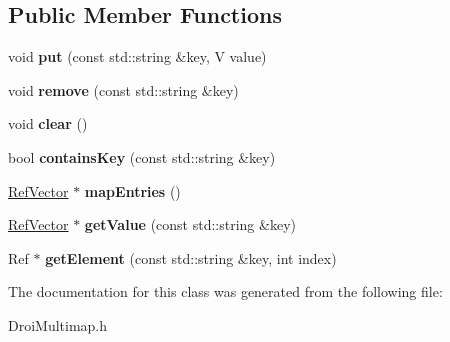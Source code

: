 \subsection*{Public Member Functions}
\begin{DoxyCompactItemize}
\item 
\mbox{\label{class_droi_multimap_a87b60b5eec7fea2e16874d48f0dc51b3}} 
void {\bfseries put} (const std\+::string \&key, V value)
\item 
\mbox{\label{class_droi_multimap_a3a7c045c401fef1138f2fe5c27fe0920}} 
void {\bfseries remove} (const std\+::string \&key)
\item 
\mbox{\label{class_droi_multimap_a8a64dbfe4e0a067e2044a1955dcac7ee}} 
void {\bfseries clear} ()
\item 
\mbox{\label{class_droi_multimap_aa0960bb306daa9b9a1482ba324671306}} 
bool {\bfseries contains\+Key} (const std\+::string \&key)
\item 
\mbox{\label{class_droi_multimap_ab6ab239b0b25f2c4e87967027a47d16f}} 
\hyperlink{class_ref_vector}{Ref\+Vector} $\ast$ {\bfseries map\+Entries} ()
\item 
\mbox{\label{class_droi_multimap_a3ab0fdebe15475ed27b8f750d46375e3}} 
\hyperlink{class_ref_vector}{Ref\+Vector} $\ast$ {\bfseries get\+Value} (const std\+::string \&key)
\item 
\mbox{\label{class_droi_multimap_af4d2bd28f58be9e580dff00a0a260e2f}} 
Ref $\ast$ {\bfseries get\+Element} (const std\+::string \&key, int index)
\end{DoxyCompactItemize}


The documentation for this class was generated from the following file\+:\begin{DoxyCompactItemize}
\item 
Droi\+Multimap.\+h\end{DoxyCompactItemize}
